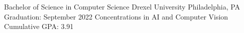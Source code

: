 

\begin{cventries}

  \cventry
    {Bachelor of Science in Computer Science} %
    {Drexel University} %
    {Philadelphia, PA} %
    {Graduation: September 2022} %
    {}
  \vspace*{-.4cm}\cventry
    {Concentrations in AI and Computer Vision}
    {}
    {}
    {Cumulative GPA: 3.91}
    {}

\end{cventries}
